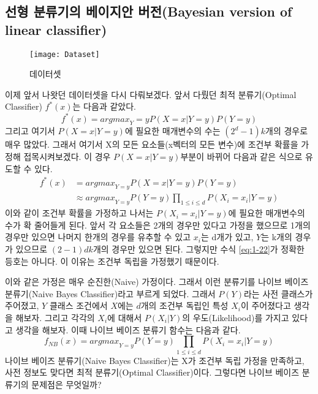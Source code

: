 \documentclass[a4paper]{oblivoir}
\begin{document}
\subsection{선형 분류기의 베이지안 버전(Bayesian version of linear classifier)}
\begin{figure}[ht]\centering
\texttt{[image: Dataset]}\caption{데이터셋}\label{Fig:3-9}
\end{figure}
이제 앞서 나왓던 데이터셋을 다시 다뤄보겠다. 앞서 다뤘던 최적 분류기(Optimal Classifier) $f^*(x)$는 다음과 같았다.
$$f^*(x) = {argmax}_Y=y P(X = x|Y = y)P(Y = y)$$
그리고 여기서 $P(X=x|Y=y)$에 필요한 매개변수의 수는 $(2^d -1)k$개의 경우로 매우 많았다. 그래서 여기서 X의 모든 요소들(x벡터의 모든 변수)에 조건부 확률을 가정해 접목시켜보겠다. 이 경우 $P(X = x|Y = y)$부분이 바뀌어 다음과 같은 식으로 유도할 수 있다.
\begin{equation}
\begin{split}
f^*(x) &= {argmax}_{Y=y} P(X = x|Y = y)P(Y = y) \\
&\approx {argmax}_{Y=y}P(Y=y) \prod_{1\le i \le d} P(X_i = x_i|Y=y)
\end{split}
\label{eq:1-22}
\end{equation}
이와 같이 조건부 확률을 가정하고 나서는 $P(X_i = x_i|Y = y)$에 필요한 매개변수의 수가 확 줄어들게 된다. 앞서 각 요소들은 2개의 경우만 있다고 가정을 했으므로 1개의 경우만 있으면 나머지 한개의 경우를 유추할 수 있고 $x_i$는 d개가 있고, $Y$는 k개의 경우가 있으므로 $(2-1)dk$개의 경우만 있으면 된다. 그렇지만 수식 \eqref{eq:1-22}가 정확한 등호는 아니다. 이 이유는 조건부 독립을 가정했기 때문이다.

이와 같은 가정은 매우 순진한(Naive) 가정이다. 그래서 이런 분류기를 나이브 베이즈 분류기(Naive Bayes Classifier)라고 부르게 되었다. 그래서 $P(Y)$라는 사전 클래스가 주어졌고, $Y$ 클래스 조건에서 $X$에는 $d$개의 조건부 독립인 특성 $X_i$이 주어졌다고 생각을 해보자. 그리고 각각의 $X_i$에 대해서 $P(X_i|Y)$의 우도(Likelihood)를 가지고 있다고 생각을 해보자. 이때 나이브 베이즈 분류기 함수는 다음과 같다.
\begin{equation}
f_{NB}(x)={argmax}_{Y=y}P(Y=y)\prod_{1\leq i \leq d}P(X_i=x_i|Y=y)
\label{eq:1-23}
\end{equation}
\indent 나이브 베이즈 분류기(Naive Bayes Classifier)는 X가 조건부 독립 가정을 만족하고, 사전 정보도 맞다면 최적 분류기(Optimal Classifier)이다. 그렇다면 나이브 베이즈 분류기의 문제점은 무엇일까?\\\\
\end{document}
